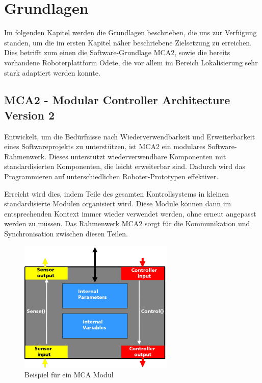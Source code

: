 \chapter{Grundlagen}
\label{grundlagen_cha}

Im folgenden Kapitel werden die Grundlagen beschrieben, die uns zur Verfügung standen, um die im ersten Kapitel näher beschriebene Zielsetzung zu erreichen. Dies betrifft zum einen die
Software-Grundlage MCA2, sowie die bereits vorhandene Roboterplattform Odete, die vor allem im Bereich Lokalisierung sehr stark adaptiert werden konnte.

\section{MCA2 - Modular Controller Architecture Version 2}
\authorsection{\editoranne}

Entwickelt, um die Bedürfnisse nach Wiederverwendbarkeit und Erweiterbarkeit eines Softwareprojekts zu unterstützen, ist MCA2 ein modulares Software-Rahmenwerk. Dieses unterstützt wiederverwendbare Komponenten mit standardisierten Komponenten, die leicht erweiterbar sind. Dadurch wird das Programmieren auf unterschiedlichen Roboter-Prototypen effektiver.

Erreicht wird dies, indem Teile des gesamten Kontrollsystems in kleinen standardisierte Modulen organisiert wird. Diese Module können dann im entsprechenden Kontext immer wieder verwendet werden, ohne erneut angepasst werden zu müssen. Das Rahmenwerk MCA2 sorgt für die Kommunikation und Synchronisation zwischen diesen Teilen.

\begin{figure}[h]
	\center
	\includegraphics[scale=2.0]{graphics/mcamodule.png}
	\caption{\label{fig:MCA-Modul} Beispiel für ein MCA Modul}
\end{figure}

